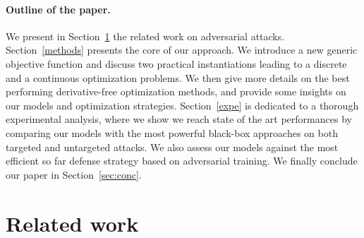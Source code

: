 \paragraph{Outline of the paper.} We present in Section~\ref{rw} the related work on adversarial attacks. Section~\ref{methods} presents the core of our approach. We introduce a new generic objective function and discuss two practical instantiations leading to a discrete and a continuous optimization problems. We then give more details on the best performing derivative-free optimization methods, and provide some insights on our models and optimization strategies. Section~\ref{expe} is dedicated to a thorough experimental analysis, where we show we reach state of the art performances by comparing our models with the most powerful black-box approaches on both targeted and untargeted attacks. We also assess our models against the most efficient so far defense strategy based on adversarial training. We finally conclude our paper in Section~\ref{sec:conc}. 



\section{Related work}
\label{rw}


